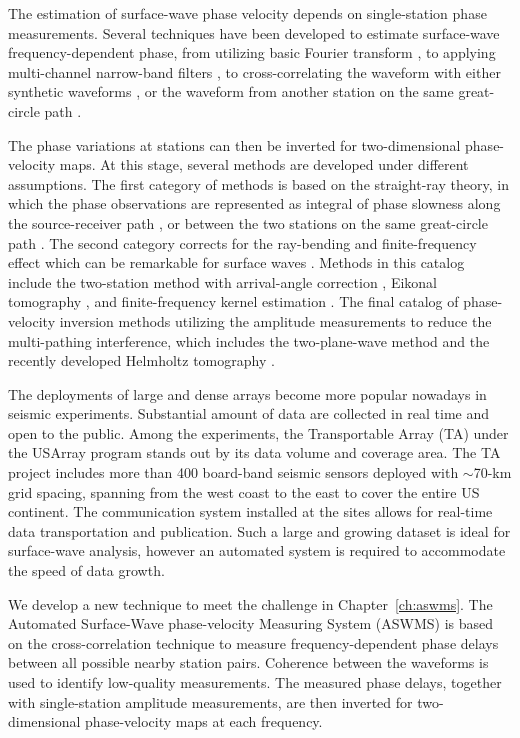 \documentclass[12pt,oneside]{book}
\begin{document}
The estimation of surface-wave phase velocity depends on single-station phase measurements. Several techniques have been developed to estimate surface-wave frequency-dependent phase, from utilizing basic Fourier transform \citep{Forsyth:2005id}, to applying multi-channel narrow-band filters \citep[e.g.][]{Levshin:1992ve}, to cross-correlating the waveform with either synthetic waveforms \citep[e.g.][]{Gee:1992ww}, or the waveform from another station on the same great-circle path \citep[e.g.][]{Landisman:1969gt}.

The phase variations at stations can then be inverted for two-dimensional phase-velocity maps. At this stage, several methods are developed under different assumptions. The first category of methods is based on the straight-ray theory, in which the phase observations are represented as integral of phase slowness along the source-receiver path \citep[e.g.][]{Nettles:2008ha}, or between the two stations on the same great-circle path \citep[e.g.][]{Yao:2005ha,Foster:2014kna}. The second category corrects for the ray-bending and finite-frequency effect which can be remarkable for surface waves \citep[e.g.][]{Evernden:1954ui,Zhou:2005fk}. Methods in this catalog include the two-station method with arrival-angle correction \citep{Foster:2014kna}, Eikonal tomography \citep{Lin:2009fx}, and finite-frequency kernel estimation \citep{Zhou:2006gna}. The final catalog of phase-velocity inversion methods utilizing the amplitude measurements to reduce the multi-pathing interference, which includes the two-plane-wave method \citep{Forsyth:2005id} and the recently developed Helmholtz tomography \citep{Lin:2011fw}.

The deployments of large and dense arrays become more popular  nowadays in seismic experiments. Substantial amount of data are collected in real time and open to the public. 
Among the experiments, the Transportable Array (TA) under the USArray program stands out by its data volume and coverage area. The TA project includes more than 400 board-band seismic sensors deployed with $\sim$70-km grid spacing, spanning from the west coast to the east to cover the entire US continent. The communication system installed at the sites allows for real-time data transportation and publication. Such a large and growing dataset is ideal for surface-wave analysis, however an automated system is required to accommodate the speed of data growth.

We develop a new technique to meet the challenge in Chapter~\ref{ch:aswms}. The Automated Surface-Wave phase-velocity Measuring System (ASWMS) is based on the cross-correlation technique to measure frequency-dependent phase delays between all possible nearby station pairs. 
Coherence between the waveforms is used to identify low-quality measurements.  
The measured phase delays, together with single-station amplitude measurements, are then inverted for two-dimensional phase-velocity maps at each frequency.
\end{document}
